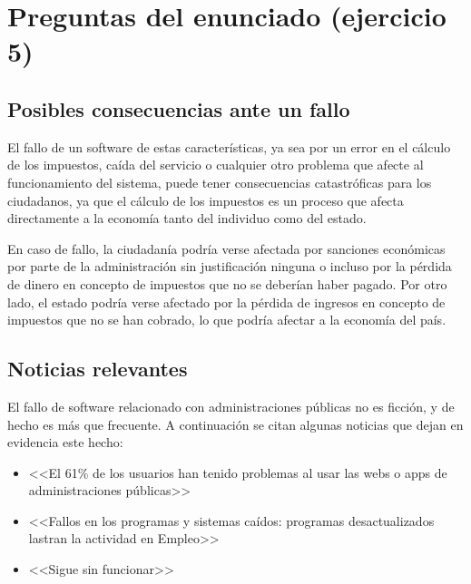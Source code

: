 \chapter{Preguntas del enunciado (ejercicio 5)}
\section{Posibles consecuencias ante un fallo}
El fallo de un software de estas características, ya sea por un error en el cálculo de los impuestos, caída
del servicio o cualquier otro problema que afecte al funcionamiento del sistema, puede tener consecuencias
catastróficas para los ciudadanos, ya que el cálculo de los impuestos es un proceso que afecta directamente
a la economía tanto del individuo como del estado.

En caso de fallo, la ciudadanía podría verse afectada por sanciones económicas por parte de la administración
sin justificación ninguna o incluso por la pérdida de dinero en concepto de impuestos que no se deberían haber
pagado. Por otro lado, el estado podría verse afectado por la pérdida de ingresos en concepto de impuestos que
no se han cobrado, lo que podría afectar a la economía del país.

\section{Noticias relevantes}
El fallo de software relacionado con administraciones públicas no es ficción, y de hecho es
más que frecuente. A continuación se citan algunas noticias que dejan en evidencia este hecho:
\begin{itemize}
	\item <<El 61\% de los usuarios han tenido problemas al usar las webs o apps de administraciones públicas>> \cite{newtral}
	\item <<Fallos en los programas y sistemas caídos: programas desactualizados lastran la actividad en Empleo>> \cite{abc}
	\item <<Sigue sin funcionar>> \cite{elpais}
\end{itemize}
